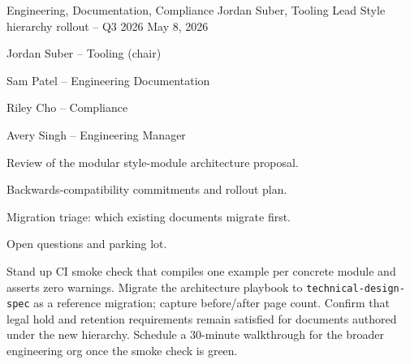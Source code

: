 \documentclass[11pt]{article}
\begin{document}
\makedoctitle

\memoheader
  {Engineering, Documentation, Compliance}
  {Jordan Suber, Tooling Lead}
  {Style hierarchy rollout -- Q3 2026}
  {May 8, 2026}

\begin{attendees}
  \item Jordan Suber -- Tooling (chair)
  \item Sam Patel -- Engineering Documentation
  \item Riley Cho -- Compliance
  \item Avery Singh -- Engineering Manager
\end{attendees}

\begin{agenda}
  \item Review of the modular style-module architecture proposal.
  \item Backwards-compatibility commitments and rollout plan.
  \item Migration triage: which existing documents migrate first.
  \item Open questions and parking lot.
\end{agenda}

\begin{decisions}
\end{decisions}

\begin{actionitems}
             {Stand up CI smoke check that compiles one example per concrete
              module and asserts zero warnings.}
             {Migrate the architecture playbook to
              \texttt{technical-design-spec} as a reference
              migration; capture before/after page count.}
             {Confirm that legal hold and retention requirements remain
              satisfied for documents authored under the new hierarchy.}
             {Schedule a 30-minute walkthrough for the broader
              engineering org once the smoke check is green.}
\end{actionitems}
\end{document}
